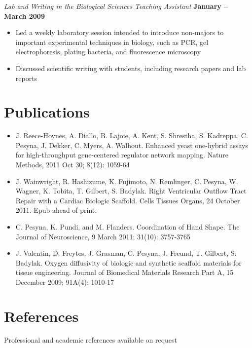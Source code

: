 \documentclass[margin,line]{resume}
\begin{document}
\begin{resume}
    \textsl{Lab and Writing in the Biological Sciences Teaching Assistant} \hfill \textbf{January -- March 2009}\vspace{1mm}%
    \begin{itemize}
    \item Led a weekly laboratory session intended to introduce non-majors to important experimental techniques in biology, such as PCR, gel electrophoresis, plating bacteria, and fluorescence microscopy
    \item Discussed scientific writing with students, including research papers and lab reports 
    \end{itemize}

    \section{\mysidestyle Publications}

    \begin{itemize}
    \item J. Reece-Hoynes, A. Diallo, B. Lajoie, A. Kent, S. Shrestha, S. Kadreppa, C. Pesyna, J. Dekker, C. Myers, A. Walhout. Enhanced yeast one-hybrid assays for high-throughput gene-centered regulator network mapping. Nature Methods, 2011 Oct 30; 8(12): 1059-64
    \item J. Wainwright, R. Hashizume, K. Fujimoto, N. Remlinger, C. Pesyna, W. Wagner, K. Tobita, T. Gilbert, S. Badylak. Right Ventricular Outflow Tract Repair with a Cardiac Biologic Scaffold. Cells Tissues Organs, 24 October 2011. Epub ahead of print.
    \item C. Pesyna, K. Pundi, and M. Flanders. Coordination of Hand Shape. The Journal of Neuroscience, 9 March 2011; 31(10): 3757-3765
    \item J. Valentin, D. Freytes, J. Grasman, C. Pesyna, J. Freund, T. Gilbert, S. Badylak. Oxygen diffusivity of biologic and synthetic scaffold materials for tissue engineering. Journal of Biomedical Materials Research Part A, 15 December 2009; 91A(4): 1010-17
    \end{itemize}

    \section{\mysidestyle References} 
    {Professional and academic references available on request}

\end{resume}
\end{document}
